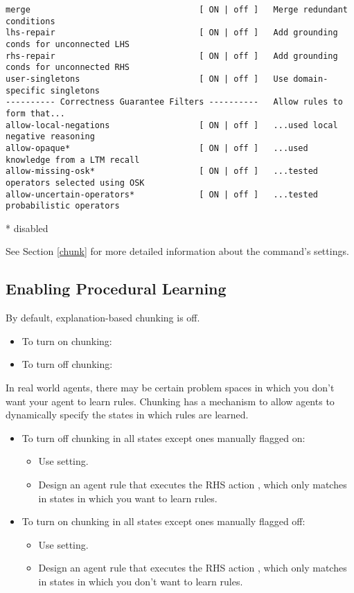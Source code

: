 {\begin{verbatim}
merge                                  [ ON | off ]   Merge redundant conditions
lhs-repair                             [ ON | off ]   Add grounding conds for unconnected LHS
rhs-repair                             [ ON | off ]   Add grounding conds for unconnected RHS
user-singletons                        [ ON | off ]   Use domain-specific singletons
---------- Correctness Guarantee Filters ----------   Allow rules to form that...
allow-local-negations                  [ ON | off ]   ...used local negative reasoning
allow-opaque*                          [ ON | off ]   ...used knowledge from a LTM recall
allow-missing-osk*                     [ ON | off ]   ...tested operators selected using OSK
allow-uncertain-operators*             [ ON | off ]   ...tested probabilistic operators
\end{verbatim}
* disabled
}

See Section \ref{chunk} for more detailed information about the  command's settings.

\subsection{Enabling Procedural Learning}
\label{CHUNKING-usage-enable}

By default, explanation-based chunking is off.

\begin{itemize}
	\item To turn on chunking: 
	\item To turn off chunking: 
\end{itemize}

In real world agents, there may be certain problem spaces in which you don't want your agent to learn rules.  Chunking has a mechanism to allow agents to dynamically specify the states in which rules are learned.

\begin{itemize}
	\item To turn off chunking in all states except ones manually flagged on:
	\begin{itemize}
		\item Use  setting.
		\item Design an agent rule that executes the RHS action , which only matches in states in which you want to learn rules.
	\end{itemize}
	\item To turn on chunking in all states except ones manually flagged off:
	\begin{itemize}
		\item Use  setting.
		\item Design an agent rule that executes the RHS action , which only matches in states in which you don't want to learn rules.
	\end{itemize}
\end{itemize}

